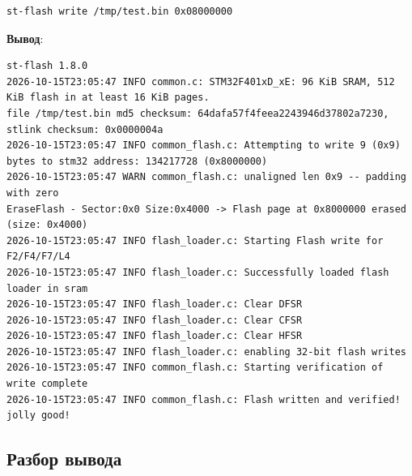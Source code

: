 \begin{verbatim}
st-flash write /tmp/test.bin 0x08000000
\end{verbatim}

\textbf{Вывод}:

\begin{verbatim}
st-flash 1.8.0
2026-10-15T23:05:47 INFO common.c: STM32F401xD_xE: 96 KiB SRAM, 512 KiB flash in at least 16 KiB pages.
file /tmp/test.bin md5 checksum: 64dafa57f4feea2243946d37802a7230, stlink checksum: 0x0000004a
2026-10-15T23:05:47 INFO common_flash.c: Attempting to write 9 (0x9) bytes to stm32 address: 134217728 (0x8000000)
2026-10-15T23:05:47 WARN common_flash.c: unaligned len 0x9 -- padding with zero
EraseFlash - Sector:0x0 Size:0x4000 -> Flash page at 0x8000000 erased (size: 0x4000)
2026-10-15T23:05:47 INFO flash_loader.c: Starting Flash write for F2/F4/F7/L4
2026-10-15T23:05:47 INFO flash_loader.c: Successfully loaded flash loader in sram
2026-10-15T23:05:47 INFO flash_loader.c: Clear DFSR
2026-10-15T23:05:47 INFO flash_loader.c: Clear CFSR
2026-10-15T23:05:47 INFO flash_loader.c: Clear HFSR
2026-10-15T23:05:47 INFO flash_loader.c: enabling 32-bit flash writes
2026-10-15T23:05:47 INFO common_flash.c: Starting verification of write complete
2026-10-15T23:05:47 INFO common_flash.c: Flash written and verified! jolly good!
\end{verbatim}

\subsection{Разбор вывода}

